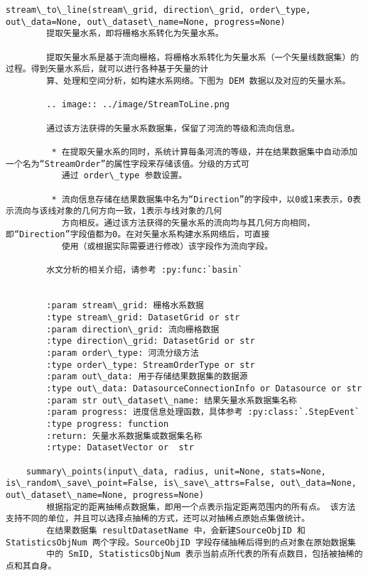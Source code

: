 \documentclass[11pt]{article}
\begin{document}
\begin{Verbatim}[commandchars=\\\{\}]
    stream\_to\_line(stream\_grid, direction\_grid, order\_type, out\_data=None, out\_dataset\_name=None, progress=None)
        提取矢量水系，即将栅格水系转化为矢量水系。
        
        提取矢量水系是基于流向栅格，将栅格水系转化为矢量水系（一个矢量线数据集）的过程。得到矢量水系后，就可以进行各种基于矢量的计
        算、处理和空间分析，如构建水系网络。下图为 DEM 数据以及对应的矢量水系。
        
        .. image:: ../image/StreamToLine.png
        
        通过该方法获得的矢量水系数据集，保留了河流的等级和流向信息。
        
         * 在提取矢量水系的同时，系统计算每条河流的等级，并在结果数据集中自动添加一个名为“StreamOrder”的属性字段来存储该值。分级的方式可
           通过 order\_type 参数设置。
        
         * 流向信息存储在结果数据集中名为“Direction”的字段中，以0或1来表示，0表示流向与该线对象的几何方向一致，1表示与线对象的几何
           方向相反。通过该方法获得的矢量水系的流向均与其几何方向相同，即“Direction”字段值都为0。在对矢量水系构建水系网络后，可直接
           使用（或根据实际需要进行修改）该字段作为流向字段。
        
        水文分析的相关介绍，请参考 :py:func:`basin`
        
        
        :param stream\_grid: 栅格水系数据
        :type stream\_grid: DatasetGrid or str
        :param direction\_grid: 流向栅格数据
        :type direction\_grid: DatasetGrid or str
        :param order\_type: 河流分级方法
        :type order\_type: StreamOrderType or str
        :param out\_data: 用于存储结果数据集的数据源
        :type out\_data: DatasourceConnectionInfo or Datasource or str
        :param str out\_dataset\_name: 结果矢量水系数据集名称
        :param progress: 进度信息处理函数，具体参考 :py:class:`.StepEvent`
        :type progress: function
        :return: 矢量水系数据集或数据集名称
        :rtype: DatasetVector or  str
    
    summary\_points(input\_data, radius, unit=None, stats=None, is\_random\_save\_point=False, is\_save\_attrs=False, out\_data=None, out\_dataset\_name=None, progress=None)
        根据指定的距离抽稀点数据集，即用一个点表示指定距离范围内的所有点。 该方法支持不同的单位，并且可以选择点抽稀的方式，还可以对抽稀点原始点集做统计。
        在结果数据集 resultDatasetName 中，会新建SourceObjID 和 StatisticsObjNum 两个字段。SourceObjID 字段存储抽稀后得到的点对象在原始数据集
        中的 SmID, StatisticsObjNum 表示当前点所代表的所有点数目，包括被抽稀的点和其自身。
        

\end{Verbatim}
\end{document}
